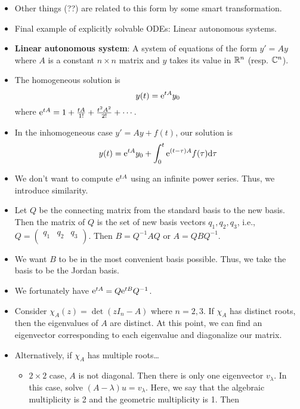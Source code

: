 \documentclass[../notes.tex]{subfiles}
\begin{document}
\begin{itemize}
    \item Other things (??) are related to this form by some smart transformation.
    \item Final example of explicitly solvable ODEs: Linear autonomous systems.
    \item \textbf{Linear autonomous system}: A system of equations of the form $y'=Ay$ where $A$ is a constant $n\times n$ matrix and $y$ takes its value in $\R^n$ (resp. $\C^n$).
    \item The homogeneous solution is
    \begin{equation*}
        y(t) = \e[tA]y_0
    \end{equation*}
    where $\e[tA] = 1+\frac{tA}{1!}+\frac{t^2A^2}{2!}+\cdots$.
    \item In the inhomogeneous case $y'=Ay+f(t)$, our solution is
    \begin{equation*}
        y(t) = \e[tA]y_0+\int_0^t\e[(t-\tau)A]f(\tau)\dd\tau
    \end{equation*}
    \item We don't want to compute $\e[tA]$ using an infinite power series. Thus, we introduce similarity.
    \item Let $Q$ be the connecting matrix from the standard basis to the new basis. Then the matrix of $Q$ is the set of new basis vectors $q_1,q_2,q_3$, i.e., $
        Q =
        \begin{pmatrix}
            q_1 & q_2 & q_3\\
        \end{pmatrix}
    $. Then $B=Q^{-1}AQ$ or $A=QBQ^{-1}$.
    \item We want $B$ to be in the most convenient basis possible. Thus, we take the basis to be the Jordan basis.
    \item We fortunately have $\e[tA]=Q\e[tB]Q^{-1}$.
    \item Consider $\chi_A(z)=\det(zI_n-A)$ where $n=2,3$. If $\chi_A$ has distinct roots, then the eigenvalues of $A$ are distinct. At this point, we can find an eigenvector corresponding to each eigenvalue and diagonalize our matrix.
    \item Alternatively, if $\chi_A$ has multiple roots\dots
    \begin{itemize}
        \item $2\times 2$ case, $A$ is not diagonal. Then there is only one eigenvector $v_\lambda$. In this case, solve $(A-\lambda)u=v_\lambda$. Here, we say that the algebraic multiplicity is 2 and the geometric multiplicity is 1. Then

\end{itemize}
\end{itemize}
\end{document}
